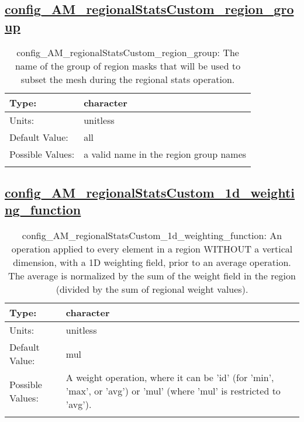 \subsection[config\_AM\_regionalStatsCustom\_region\_group]{\hyperref[sec:nm_tab_AM_regionalStatsCustom]{config\_AM\_regionalStatsCustom\_region\_group}}
\label{subsec:nm_sec_config_AM_regionalStatsCustom_region_group}
\begin{center}
\begin{longtable}{| p{2.0in} || p{4.0in} |}
    \hline
    Type: & character \\
    \hline
    Units: & \si{unitless} \\
    \hline
    Default Value: & all \\
    \hline
    Possible Values: & a valid name in the region group names \\
    \hline
    \caption{config\_AM\_regionalStatsCustom\_region\_group: The name of the group of region masks that will be used to subset the mesh during the regional stats operation.}
\end{longtable}
\end{center}
\subsection[config\_AM\_regionalStatsCustom\_1d\_weighting\_function]{\hyperref[sec:nm_tab_AM_regionalStatsCustom]{config\_AM\_regionalStatsCustom\_1d\_weighting\_function}}
\label{subsec:nm_sec_config_AM_regionalStatsCustom_1d_weighting_function}
\begin{center}
\begin{longtable}{| p{2.0in} || p{4.0in} |}
    \hline
    Type: & character \\
    \hline
    Units: & \si{unitless} \\
    \hline
    Default Value: & mul \\
    \hline
    Possible Values: & A weight operation, where it can be 'id' (for 'min', 'max', or 'avg') or 'mul' (where 'mul' is restricted to 'avg'). \\
    \hline
    \caption{config\_AM\_regionalStatsCustom\_1d\_weighting\_function: An operation applied to every element in a region WITHOUT a vertical dimension, with a 1D weighting field, prior to an average operation. The average is normalized by the sum of the weight field in the region (divided by the sum of regional weight values).}
\end{longtable}
\end{center}
